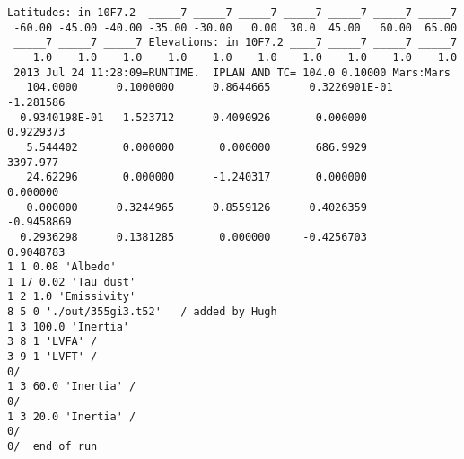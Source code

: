 \documentclass{article}
\begin{document}
\begin{verbatim}
Latitudes: in 10F7.2  _____7 _____7 _____7 _____7 _____7 _____7 _____7          
 -60.00 -45.00 -40.00 -35.00 -30.00   0.00  30.0  45.00   60.00  65.00
 _____7 _____7 _____7 Elevations: in 10F7.2 ____7 _____7 _____7 _____7          
    1.0    1.0    1.0    1.0    1.0    1.0    1.0    1.0    1.0    1.0
 2013 Jul 24 11:28:09=RUNTIME.  IPLAN AND TC= 104.0 0.10000 Mars:Mars           
   104.0000      0.1000000      0.8644665      0.3226901E-01  -1.281586         
  0.9340198E-01   1.523712      0.4090926       0.000000      0.9229373         
   5.544402       0.000000       0.000000       686.9929       3397.977         
   24.62296       0.000000      -1.240317       0.000000       0.000000         
   0.000000      0.3244965      0.8559126      0.4026359     -0.9458869         
  0.2936298      0.1381285       0.000000     -0.4256703      0.9048783
1 1 0.08 'Albedo'
1 17 0.02 'Tau dust'
1 2 1.0 'Emissivity'
8 5 0 './out/355gi3.t52'   / added by Hugh
1 3 100.0 'Inertia'
3 8 1 'LVFA' /
3 9 1 'LVFT' /
0/
1 3 60.0 'Inertia' /
0/
1 3 20.0 'Inertia' /
0/
0/  end of run
\end{verbatim} 
\end{document}
